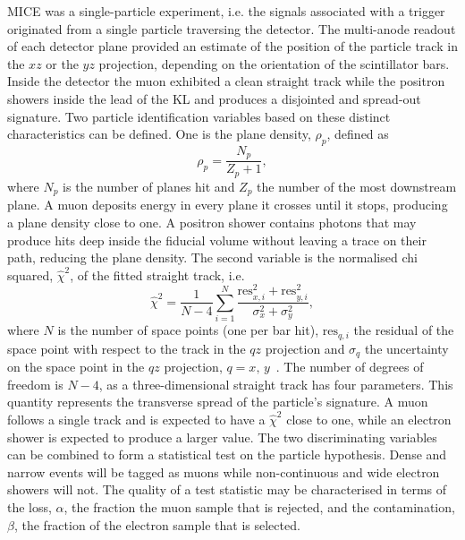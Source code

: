 MICE was a single-particle experiment, i.e. the signals associated with a trigger originated from a single particle traversing the detector. The multi-anode readout of each detector plane provided an estimate of the position of the particle track in the $xz$ or the $yz$ projection, depending on the orientation of the scintillator bars.
Inside the detector the muon exhibited a clean straight track while the positron showers inside the lead of the KL and produces a disjointed and spread-out signature. 
Two particle identification variables based on these distinct characteristics can be defined. One is the plane density, $\rho_p$, defined as
\begin{equation}
\rho_p = \frac{N_p}{Z_p+1},
\end{equation}
where $N_p$ is the number of planes hit and $Z_p$ the number of the most downstream plane. A muon deposits energy in every plane it crosses until it stops, producing a plane density close to one. A positron shower contains photons that may produce hits deep inside the fiducial volume without leaving a trace on their path, reducing the plane density. The second variable is the normalised chi squared, $\hat{\chi}^2$, of the fitted straight track, i.e.
\begin{equation}
\hat{\chi}^2=\frac{1}{N-4}\sum_{i=1}^{N}\frac{\text{res}_{x,i}^2+\text{res}_{y,i}^2}{\sigma_x^2+\sigma_y^2},
\end{equation}
where $N$ is the number of space points (one per bar hit), $\text{res}_{q,i}$ the residual of the space point with respect to the track in the $qz$ projection and $\sigma_q$ the uncertainty on the space point in the $qz$ projection, $q=x,\,y$~\cite{Drielsma:thesis}. The number of degrees of freedom is $N-4$, as a three-dimensional straight track has four parameters. This quantity represents the transverse spread of the particle's signature. A muon follows a single track and is expected to have a $\hat{\chi}^2$ close to one, while an electron shower is expected to produce a larger value.
The two discriminating variables can be combined to form a statistical test on the particle hypothesis.
Dense and narrow events will be tagged as muons while non-continuous and wide electron showers will not. 
The quality of a test statistic may be characterised in terms of the loss, $\alpha$, the fraction the muon sample that is rejected, and the contamination, $\beta$, the fraction of the electron sample that is selected.

